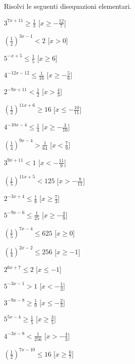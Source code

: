 \begin{esercizio}\label{ese:}
 Risolvi le seguenti disequazioni elementari.
 \begin{multicols}{2}
 \begin{enumeratea}
  \item  \(3^{7 x +11} \geqslant \frac{1}{3}\)
   \hfill [\(x \geqslant -\frac{12}{7}\)]
  \item  \(\left(\frac{1}{2}\right)^{3 x -1} < 2\)
   \hfill [\(x > 0\)]
  \item  \(5^{- x +5} \leqslant \frac{1}{5}\)
   \hfill [\(x \geqslant 6\)]
  \item  \(4^{-12 x -12} \leqslant \frac{1}{16}\)
   \hfill [\(x \geqslant -\frac{5}{6}\)]
  \item  \(2^{-9 x +11} < \frac{1}{2}\)
   \hfill [\(x > \frac{4}{3}\)]
  \item  \(\left(\frac{1}{2}\right)^{11 x +6} \geqslant 16\)
   \hfill [\(x \leqslant -\frac{10}{11}\)]
  \item  \(4^{-10 x -4} \leqslant \frac{1}{4}\)
   \hfill [\(x \geqslant -\frac{3}{10}\)]
  \item  \(\left(\frac{1}{4}\right)^{9 x -4} > \frac{1}{64}\)
   \hfill [\(x < \frac{7}{9}\)]
  \item  \(3^{9 x +11} < 1\)
   \hfill [\(x < -\frac{11}{9}\)]
  \item  \(\left(\frac{1}{5}\right)^{11 x +5} < 125\)
   \hfill [\(x > -\frac{8}{11}\)]
  \item  \(2^{-3 x +4} \leqslant \frac{1}{8}\)
   \hfill [\(x \geqslant \frac{7}{3}\)]
  \item  \(5^{-9 x -6} \leqslant \frac{1}{25}\)
   \hfill [\(x \geqslant -\frac{4}{9}\)]
  \item  \(\left(\frac{1}{5}\right)^{7 x -4} \leqslant 625\)
   \hfill [\(x \geqslant 0\)]
  \item  \(\left(\frac{1}{4}\right)^{2 x -2} \leqslant 256\)
   \hfill [\(x \geqslant -1\)]
  \item  \(2^{6 x +7} \leqslant 2\)
   \hfill [\(x \leqslant -1\)]
  \item  \(5^{-3 x -1} > 1\)
   \hfill [\(x < -\frac{1}{3}\)]
  \item  \(3^{-9 x -8} \geqslant \frac{1}{9}\)
   \hfill [\(x \leqslant -\frac{2}{3}\)]
  \item  \(5^{5 x -4} \geqslant \frac{1}{5}\)
   \hfill [\(x \geqslant \frac{3}{5}\)]
  \item  \(4^{-3 x -8} < \frac{1}{256}\)
   \hfill [\(x > -\frac{4}{3}\)]
  \item  \(\left(\frac{1}{2}\right)^{7 x -10} \leqslant 16\)
   \hfill [\(x \geqslant \frac{6}{7}\)]
 \end{enumeratea}
 \end{multicols}
\end{esercizio}




